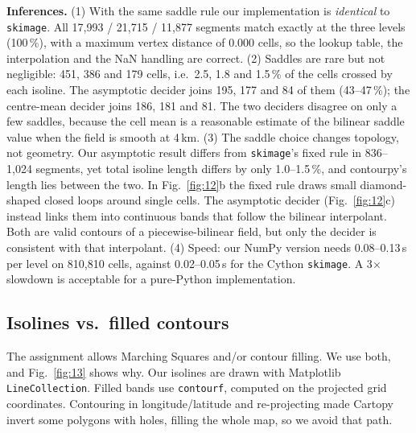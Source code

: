

\textbf{Inferences.}
(1) With the same saddle rule our implementation is \emph{identical} to \texttt{skimage}. All 17,993 / 21,715 / 11,877
segments match exactly at the three levels (100\,\%), with a maximum vertex distance of 0.000 cells, so the lookup table,
the interpolation and the NaN handling are correct.
(2) Saddles are rare but not negligible: 451, 386 and 179 cells, i.e.\ 2.5, 1.8 and 1.5\,\% of the cells crossed by each
isoline. The asymptotic decider joins 195, 177 and 84 of them (43--47\,\%); the centre-mean decider joins 186, 181 and 81. The
two deciders disagree on only a few saddles, because the cell mean is a reasonable estimate of the bilinear saddle value
when the field is smooth at 4\,km.
(3) The saddle choice changes topology, not geometry. Our asymptotic result differs from \texttt{skimage}'s fixed rule in
836--1,024 segments, yet total isoline length differs by only 1.0--1.5\,\%, and contourpy's length lies between the two.
In Fig.~\ref{fig:12}b the fixed rule draws small diamond-shaped closed loops around single cells. The asymptotic decider
(Fig.~\ref{fig:12}c) instead links them into continuous bands that follow the bilinear interpolant. Both are valid
contours of a piecewise-bilinear field, but only the decider is consistent with that interpolant.
(4) Speed: our NumPy version needs 0.08--0.13\,s per level on 810,810 cells, against 0.02--0.05\,s for the Cython
\texttt{skimage}. A 3$\times$ slowdown is acceptable for a pure-Python implementation.

\subsection{Isolines vs.\ filled contours}
The assignment allows Marching Squares and/or contour filling. We use both, and Fig.~\ref{fig:13} shows why. Our isolines
are drawn with Matplotlib \texttt{LineCollection}. Filled bands use \texttt{contourf}, computed on the projected grid
coordinates. Contouring in longitude/latitude and re-projecting made Cartopy invert some polygons with holes, filling the
whole map, so we avoid that path.


